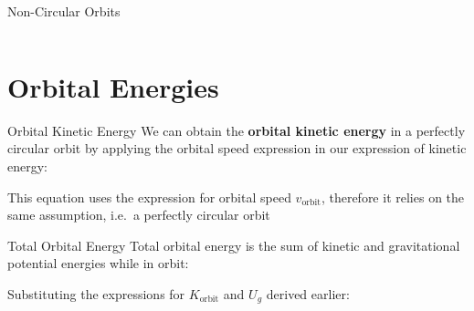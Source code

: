 \documentclass[12pt,compress,aspectratio=169]{beamer}
\begin{document}
\begin{frame}{Non-Circular Orbits}
\begin{columns}[T]
    \begin{center}
    \end{center}
  \end{columns}
\end{frame}



\section{Orbital Energies}

\begin{frame}{Orbital Kinetic Energy}
  We can obtain the \textbf{orbital kinetic energy} in a perfectly circular
  orbit by applying the orbital speed expression in our expression of kinetic
  energy:
  

  This equation uses the expression for orbital speed $v_\text{orbit}$,
  therefore it relies on the same assumption, i.e.\ a perfectly circular orbit
\end{frame}



\begin{frame}{Total Orbital Energy}
  Total orbital energy is the sum of kinetic and gravitational potential
  energies while in orbit:

  
  Substituting the expressions for $K_\text{orbit}$ and $U_g$ derived earlier:

\end{frame}
\end{document}

